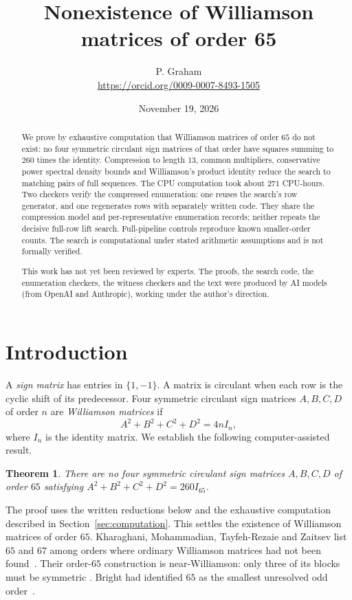 \documentclass[11pt]{article}
\title{Nonexistence of Williamson matrices of order 65}
\author{P. Graham\\ \small\url{https://orcid.org/0009-0007-8493-1505}}
\date{November 19, 2026}
\newtheorem{theorem}{Theorem}
\begin{document}
\maketitle
\begin{abstract}
We prove by exhaustive computation that Williamson matrices of order
$65$ do not exist: no four symmetric circulant sign matrices of that
order have squares summing to $260$ times the identity. Compression to
length $13$, common multipliers, conservative power spectral density
bounds and Williamson's product identity reduce the search to matching
pairs of full sequences. The CPU computation took about $271$ CPU-hours.
Two checkers verify the compressed enumeration: one reuses the search's row
generator, and one regenerates rows with separately written code. They
share the compression model and per-representative enumeration records;
neither repeats the decisive
full-row lift search. Full-pipeline controls reproduce known smaller-order counts.
The search is computational under stated arithmetic assumptions and is
not formally verified.

This work has not yet been reviewed by experts.
The proofs, the search code, the enumeration checkers, the witness checkers
and the text were produced by AI models (from OpenAI and Anthropic),
working under the author's direction.
\end{abstract}

\section{Introduction}
A \emph{sign matrix} has entries in $\{1,-1\}$. A matrix is circulant when
each row is the cyclic shift of its predecessor. Four symmetric circulant
sign matrices $A,B,C,D$ of order $n$ are \emph{Williamson matrices} if
\begin{equation}\label{eq:matrix}
 A^2+B^2+C^2+D^2=4nI_n,
\end{equation}
where $I_n$ is the identity matrix. We establish the following
computer-assisted result.
\begin{theorem}\label{thm:main}
There are no four symmetric circulant sign matrices $A,B,C,D$ of order
$65$ satisfying $A^2+B^2+C^2+D^2=260I_{65}$.
\end{theorem}

The proof uses the written reductions below and the exhaustive computation
described in Section~\ref{sec:computation}. This settles the existence of
Williamson matrices of order $65$. Kharaghani, Mohammadian, Tayfeh-Rezaie and Zaitsev
list $65$ and $67$ among orders where ordinary Williamson matrices had
not been found~\cite[Section~2.3]{KMTZ}. Their order-$65$ construction is
near-Williamson: only three of its blocks must be symmetric
\cite[Definition~1.1, Table~6]{KMTZ}. Bright had identified $65$ as the
smallest unresolved odd order~\cite[Section~4.2]{BrightStatement}.
\end{document}
